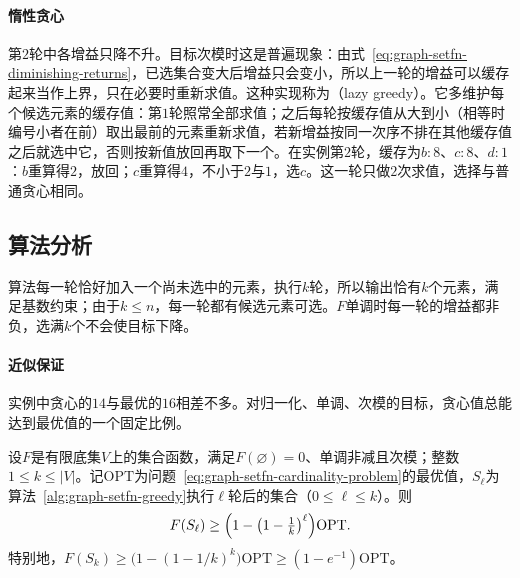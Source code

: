 \paragraph{惰性贪心}
第$2$轮中各增益只降不升。目标次模时这是普遍现象：由式~\eqref{eq:graph-setfn-diminishing-returns}，已选集合变大后增益只会变小，所以上一轮的增益可以缓存起来当作上界，只在必要时重新求值。这种实现称为（lazy greedy）。它多维护每个候选元素的缓存值：第$1$轮照常全部求值；之后每轮按缓存值从大到小（相等时编号小者在前）取出最前的元素重新求值，若新增益按同一次序不排在其他缓存值之后就选中它，否则按新值放回再取下一个。在实例第$2$轮，缓存为$b{:}8$、$c{:}8$、$d{:}1$：$b$重算得$2$，放回；$c$重算得$4$，不小于$2$与$1$，选$c$。这一轮只做$2$次求值，选择与普通贪心相同。

\subsection{算法分析}
\label{sec:graph-setfn-greedy-guarantee}

算法每一轮恰好加入一个尚未选中的元素，执行$k$轮，所以输出恰有$k$个元素，满足基数约束；由于$k\leq n$，每一轮都有候选元素可选。$F$单调时每一轮的增益都非负，选满$k$个不会使目标下降。

\paragraph{近似保证}
实例中贪心的$14$与最优的$16$相差不多。对归一化、单调、次模的目标，贪心值总能达到最优值的一个固定比例。

\begin{theorem}[贪心的近似保证]
\label{thm:graph-setfn-greedy-guarantee}
设$F$是有限底集$V$上的集合函数，满足$F(\varnothing)=0$、单调非减且次模；整数$1\leq k\leq|V|$。记$\mathrm{OPT}$为问题~\eqref{eq:graph-setfn-cardinality-problem}的最优值，$S_\ell$为算法~\ref{alg:graph-setfn-greedy}执行$\ell$轮后的集合（$0\leq\ell\leq k$）。则
\[
  F(S_\ell)\geq\Bigl(1-\bigl(1-\tfrac1k\bigr)^{\ell}\Bigr)\mathrm{OPT}.
\]
特别地，$F(S_k)\geq\bigl(1-(1-1/k)^k\bigr)\mathrm{OPT}\geq(1-e^{-1})\mathrm{OPT}$。
\end{theorem}

